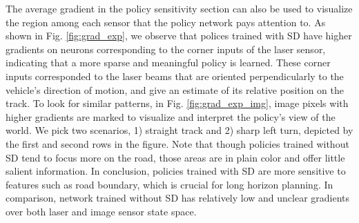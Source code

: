 \documentclass[../thesis.tex]{subfiles}
\begin{document}
The average gradient in the policy sensitivity section can also be used to visualize the region among each sensor that the policy network pays attention to. As shown in Fig. \ref{fig:grad_exp}, we observe that polices trained with SD have higher gradients on neurons corresponding to the corner inputs of the laser sensor, indicating that a more sparse and meaningful policy is learned. These corner inputs corresponded to the laser beams that are oriented perpendicularly to the vehicle's direction of motion, and give an estimate of its relative position on the track. To look for similar patterns, in Fig. \ref{fig:grad_exp_img}, image pixels with higher gradients are marked to visualize and interpret the policy's view of the world. We pick two scenarios, 1) straight track and 2) sharp left turn, depicted by the first and second rows in the figure. Note that though policies trained without SD tend to focus more on the road, those areas are in plain color and offer little salient information. In conclusion, policies trained with SD are more sensitive to features such as road boundary, which is crucial for long horizon planning. In comparison, network trained without SD has relatively low and unclear gradients over both laser and image sensor state space.
 
 
 
 
 
\end{document}

